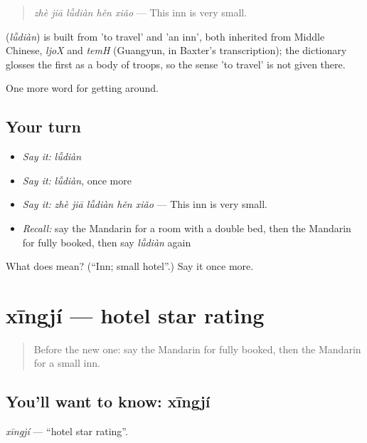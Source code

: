 \begin{quote}
\textbf{} \emph{zhè jiā lǚdiàn hěn xiǎo} — This inn is very small.
\end{quote}

\begin{cousinweb}
\textbf{} (\emph{lǚdiàn}) is built from  'to travel' and  'an inn', both inherited from Middle Chinese, \emph{ljoX} and \emph{temH} (Guangyun, in Baxter's transcription); the dictionary glosses the first as a body of troops, so the sense 'to travel' is not given there.
\end{cousinweb}

\begin{grammarlens}[title={What you've built}]
One more word for getting around.
\end{grammarlens}

\subsection*{Your turn}
\begin{itemize}
\raggedright
  \item \emph{Say it:} \emph{lǚdiàn}
  \item \emph{Say it:} \emph{lǚdiàn}, once more
  \item \emph{Say it:} \emph{zhè jiā lǚdiàn hěn xiǎo} — This inn is very small.
  \item \emph{Recall:} say the Mandarin for a room with a double bed, then the Mandarin for fully booked, then say \emph{lǚdiàn} again
\end{itemize}

\begin{tcolorbox}[breakable,colback=teal!4,colframe=teal!35!black,title={Before you move on}]
What does  mean? (\textquotedblleft{}Inn; small hotel\textquotedblright{}.) Say it once more.
\end{tcolorbox}
\section[xīngjí]{xīngjí — hotel star rating}

\label{lesson:ZH-C426-xingji}



\begin{quote}
Before the new one: say the Mandarin for fully booked, then the Mandarin for a small inn.
\end{quote}

\subsection*{You'll want to know: xīngjí}
\emph{xīngjí} — \textquotedblleft{}hotel star rating\textquotedblright{}.

